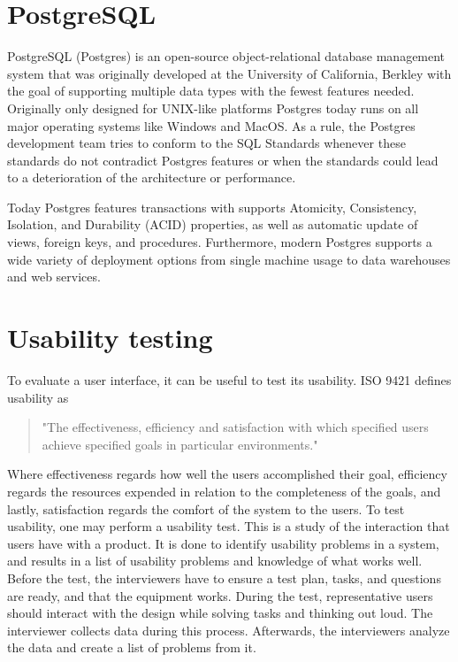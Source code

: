 \section*{PostgreSQL}
PostgreSQL (Postgres) is an open-source object-relational database management system that was originally developed at the University of California, Berkley with the goal of supporting multiple data types with the fewest features needed. Originally only designed for UNIX-like platforms Postgres today runs on all major operating systems like Windows and MacOS\cite{Postgres_Docs}.
As a rule, the Postgres development team tries to conform to the SQL Standards whenever these standards do not contradict Postgres features or when the standards could lead to a deterioration of the architecture or performance\cite{Postgres_Docs}. 

Today Postgres features transactions with supports Atomicity, Consistency, Isolation, and Durability (ACID) properties, as well as automatic update of views, foreign keys, and procedures. 
Furthermore, modern Postgres supports a wide variety of deployment options from single machine usage to data warehouses and web services\cite{Postgres_Docs}.

\section*{Usability testing}
To evaluate a user interface, it can be useful to test its usability. ISO 9421 defines usability as
\begin{quote}
	"The effectiveness, efficiency and satisfaction with which specified users achieve specified goals in particular environments."
\end{quote}

Where effectiveness regards how well the users accomplished their goal, efficiency regards the resources expended in relation to the completeness of the goals, and lastly, satisfaction regards the comfort of the system to the users.
To test usability, one may perform a usability test. This is a study of the interaction that users have with a product. It is done to identify usability problems in a system, and results in a list of usability problems and knowledge of what works well.
Before the test, the interviewers have to ensure a test plan, tasks, and questions are ready, and that the equipment works.
During the test, representative users should interact with the design while solving tasks and thinking out loud. The interviewer collects data during this process.
Afterwards, the interviewers analyze the data and create a list of problems from it.
\cite{deb7}


